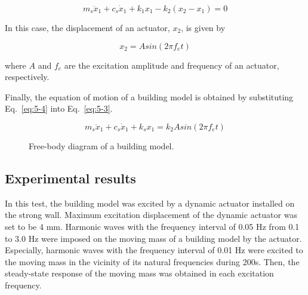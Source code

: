 \begin{equation}\label{eq:5-3}
m_{s}\ddot{x}_{1}+c_{s}\dot{x}_{1}+k_{1}x_{1}-k_{2}\left(x_{2}-x_{1}\right)=0
\end{equation}

In this case, the displacement of an actuator, $x_{2}$, is given by

\begin{equation}\label{eq:5-4}
x_{2}=A sin \left(2 \pi f_{e} t \right)
\end{equation}

where $A$ and $f_{e}$ are the excitation amplitude and frequency of an actuator, respectively.

Finally, the equation of motion of a building model is obtained by substituting Eq.~\eqref{eq:5-4} into Eq.~\eqref{eq:5-3}.

\begin{equation}\label{eq:5-5}
m_{s}\ddot{x}_{1}+c_{s}\dot{x}_{1}+k_{s}x_{1} = k_{2}A sin \left(2 \pi f_{e} t \right)
\end{equation}

\begin{figure}[!ht]
\centering
{}
\caption{Free-body diagram of a building model.}
\label{fig:5-5}
\end{figure}

\subsection{Experimental results}
In this test, the building model was excited by a dynamic actuator installed on the strong wall. Maximum excitation displacement of the dynamic actuator was set to be 4 mm. Harmonic waves with the frequency interval of 0.05 Hz from 0.1 to 3.0 Hz were imposed on the moving mass of a building model by the actuator. Especially, harmonic waves with the frequency interval of 0.01 Hz were excited to the moving mass in the vicinity of its natural frequencies during 200s. Then, the steady-state response of the moving mass was obtained in each excitation frequency.

